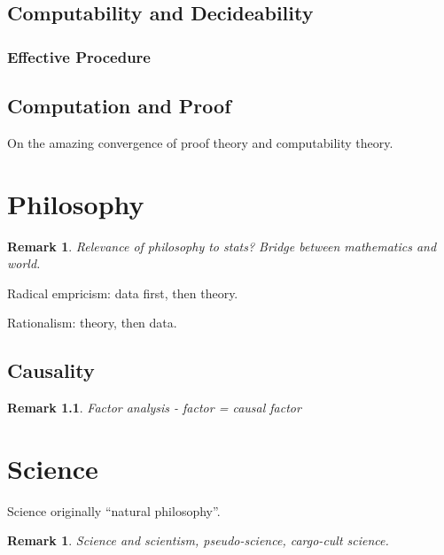 \documentclass[reqno,12pt]{tufte-book}
\numberwithin{equation}{subsection}
\newtheorem{remark}{Remark}
\begin{document}
\chapter{Computability and Decideability}

\section{Effective Procedure}


\chapter{Computation and Proof}

On the amazing convergence of proof theory and computability theory.

\part{Philosophy}

\begin{remark}
  Relevance of philosophy to stats?  Bridge between mathematics and world.
\end{remark}

Radical empricism: data first, then theory.

Rationalism: theory, then data.

\chapter{Causality}

\begin{remark}
  Factor analysis - factor = causal factor
\end{remark}

\part{Science}

Science originally ``natural philosophy''.

\begin{remark}
  Science and scientism, pseudo-science, cargo-cult science.
\end{remark}
\end{document}
